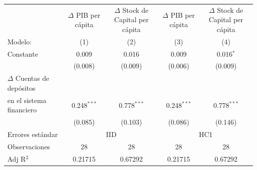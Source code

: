 \begingroup
\centering
\begin{tabular}{lcccc}
   \tabularnewline \midrule \midrule
                                             & $\Delta$ PIB per cápita  & \makecell{$\Delta$ Stock de Capital \\per cápita}     & $\Delta$ PIB per cápita  & \makecell{$\Delta$ Stock de Capital \\per cápita}\\      
   Modelo:                                                       & (1)                      & (2)                                                   & (3)                      & (4)\\  
   \midrule
 
   Constante                                                     & 0.009                    & 0.016                                                 & 0.009                    & 0.016$^{*}$\\   
                                                                & (0.008)                  & (0.009)                                               & (0.006)                  & (0.009)\\   
   $\Delta$ Cuentas de depósitos \\ en el sistema financiero    & 0.248$^{***}$            & 0.778$^{***}$                                         & 0.248$^{***}$            & 0.778$^{***}$\\   
                                                                & (0.085)                  & (0.103)                                               & (0.086)                  & (0.146)\\   
   \midrule
   Errores estándar & \multicolumn{2}{c}{IID} & \multicolumn{2}{c}{HC1} \\ 
   Observaciones                                                 & 28                       & 28                                                    & 28                       & 28\\  
   Adj R$^2$                                               & 0.21715                  & 0.67292                                               & 0.21715                  & 0.67292\\  
   \midrule \midrule
\end{tabular}
\par\endgroup
